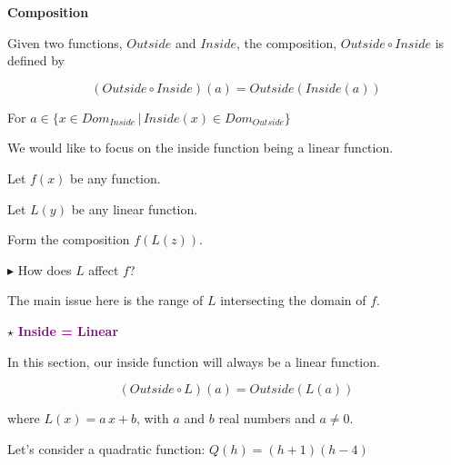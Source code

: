 \documentclass{ximera}
\begin{document}
\begin{idea} \textbf{\textcolor{blue!55!black}{Composition}}  


Given two functions, $Outside$ and $Inside$, the composition, $Outside \circ Inside$ is defined by

\[      (Outside \circ Inside)(a) = Outside(Inside(a))        \]

For $ a \in \{  x \in Dom_{Inside} \, | \,    Inside(x) \in Dom_{Outside}  \}$

\end{idea}

We would like to focus on the inside function being a linear function.




Let $f(x)$ be any function. 

Let $L(y)$ be any linear function. 


Form the composition $f(L(z))$. 

$\blacktriangleright$ How does $L$ affect $f$?




The main issue here is the range of $L$ intersecting the domain of $f$. 











$\star$ \textbf{\textcolor{purple}{Inside = Linear}}


In this section, our inside function will always be a linear function.



\[      (Outside \circ L)(a) = Outside(L(a))        \]


where $L(x) = a \, x + b$, with $a$ and $b$ real numbers and $a \ne 0$.



Let's consider a quadratic function: $Q(h) = (h+1)(h-4)$
\end{document}

